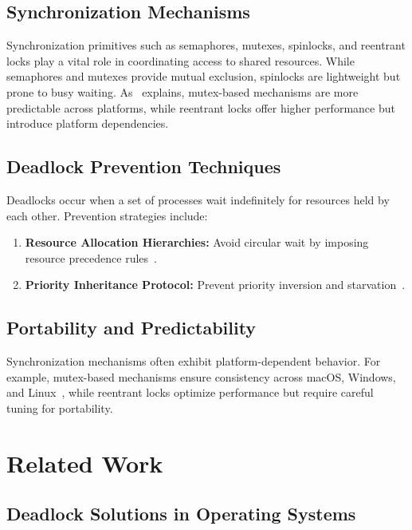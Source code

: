 \documentclass[conference,a4paper]{IEEEtran}
\begin{document}
\subsection{Synchronization Mechanisms}

Synchronization primitives such as semaphores, mutexes, spinlocks, and reentrant locks play a vital role in coordinating access to shared resources. While semaphores and mutexes provide mutual exclusion, spinlocks are lightweight but prone to busy waiting. As~\cite{arxiv} explains, mutex-based mechanisms are more predictable across platforms, while reentrant locks offer higher performance but introduce platform dependencies.

\subsection{Deadlock Prevention Techniques}

Deadlocks occur when a set of processes wait indefinitely for resources held by each other. Prevention strategies include:

\begin{enumerate}
    \item \textbf{Resource Allocation Hierarchies:} Avoid circular wait by imposing resource precedence rules~\cite{jetir}.
    \item \textbf{Priority Inheritance Protocol:} Prevent priority inversion and starvation~\cite{bbk, xinuosdeadlocks}.
\end{enumerate}

\subsection{Portability and Predictability}

Synchronization mechanisms often exhibit platform-dependent behavior. For example, mutex-based mechanisms ensure consistency across macOS, Windows, and Linux~\cite{arxiv}, while reentrant locks optimize performance but require careful tuning for portability.

\section{Related Work}

\subsection{Deadlock Solutions in Operating Systems}
\end{document}
